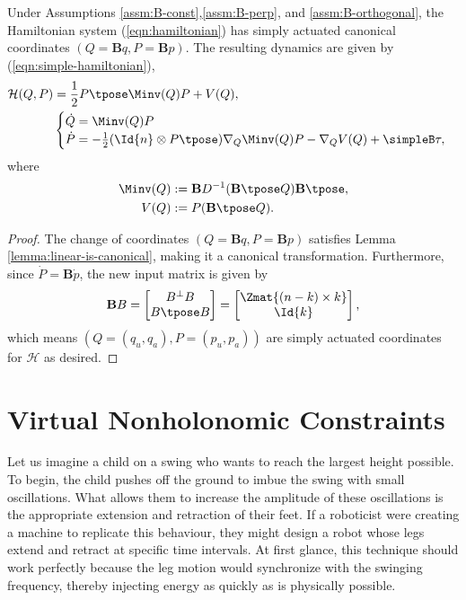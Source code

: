 \begin{thm}\label{thm:simply-actuated}
    Under Assumptions \ref{assm:B-const},\ref{assm:B-perp}, and
    \ref{assm:B-orthogonal}, the Hamiltonian system (\ref{eqn:hamiltonian})
    has simply actuated canonical coordinates 
    \(\left(Q = \mathbf{B}q, P = \mathbf{B}p\right)\). The resulting dynamics are 
    given by (\ref{eqn:simple-hamiltonian}),
    \begin{align}\label{eqn:simple-hamiltonian}
        \mathcal{H}(Q,P) &= 
        \frac{1}{2} P\tpose \Minv(Q) P + V(Q)
        , \\
       &\begin{cases}
            \dot{Q} = \Minv(Q)P \\
            \dot{P} = -\frac{1}{2} (\Id{n} \otimes P\tpose) \nabla_Q \Minv(Q) P
                - \nabla_Q V(Q) + \simpleB \tau
            ,
        \end{cases} \nonumber
    \end{align}
    where
    \begin{align*}
        \Minv(Q) &:= \mathbf{B}D^{-1}(\mathbf{B}\tpose Q)\mathbf{B}\tpose
        , \\
        V(Q) &:= P(\mathbf{B}\tpose Q)
        .
    \end{align*}
\end{thm}
\begin{proof}
    The change of coordinates \((Q = \mathbf{B}q, P = \mathbf{B}p)\)
    satisfies Lemma \ref{lemma:linear-is-canonical}, making it a canonical
    transformation.
    Furthermore, since \(\dot{P} = \mathbf{B}\dot{p}\), the new input matrix is
    given by 
    \[
        \mathbf{B}B = \begin{bmatrix}
            B^\perp B \\
            B\tpose B \\
        \end{bmatrix} = 
        \begin{bmatrix}
            \Zmat{(n-k)\times k} \\
            \Id{k}
        \end{bmatrix}
        ,
    \]
    which means \(\left(Q = (q_u,q_a), P = (p_u,p_a)\right)\) are simply
    actuated coordinates for \(\mathcal{H}\) as desired.
\end{proof}

\section{Virtual Nonholonomic Constraints}
Let us imagine a child on a swing who wants to reach the largest height
possible. 
To begin, the child pushes off the ground to imbue the swing with small oscillations.
What allows them to increase the amplitude of these oscillations is the
appropriate extension and retraction of their feet.
If a roboticist were creating a machine to replicate this behaviour, they might
design a robot whose legs extend and retract at specific time intervals. 
At first glance, this technique should work perfectly because the leg motion
would synchronize with the swinging frequency, thereby injecting energy as
quickly as is physically possible.

